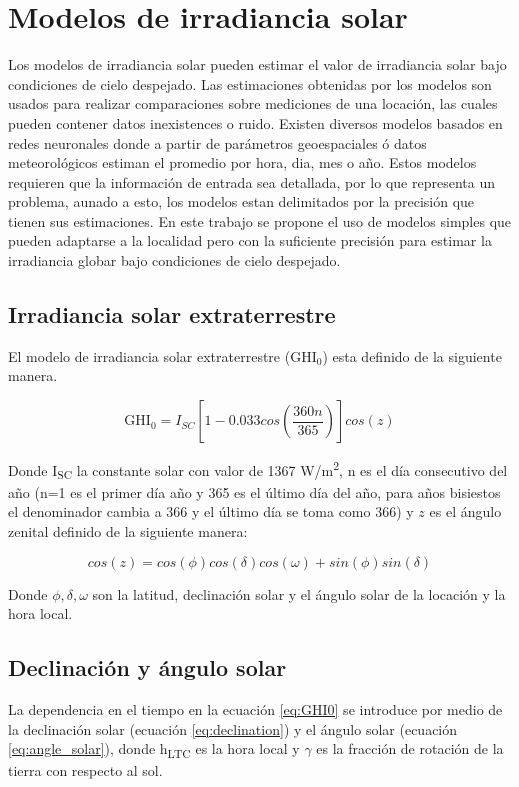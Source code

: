\section{Modelos de irradiancia solar}
Los modelos de irradiancia solar pueden estimar el valor de irradiancia solar bajo condiciones de cielo despejado\cite{Gueymard_2012,Perez_Burgos_2017,Ineichen_2016}. Las estimaciones obtenidas por los modelos son usados para realizar comparaciones sobre mediciones de una locación, las cuales pueden contener datos inexistences o ruido. Existen diversos modelos basados en redes neuronales donde a partir de parámetros geoespaciales ó datos meteorológicos estiman el promedio por hora, dia, mes o año\cite{Hasni_2012,Kumar_2019,Ozgoren_2012,Sahan_2016}. Estos modelos requieren que la información de entrada sea detallada, por lo que representa un problema, aunado a esto, los modelos estan delimitados por la precisión que tienen sus estimaciones\cite{Ruiz_Arias_2018}. En este trabajo se propone el uso de modelos simples que pueden adaptarse a la localidad pero con la suficiente precisión para estimar la irradiancia globar bajo condiciones de cielo despejado.

\subsection{Irradiancia solar extraterrestre}
El modelo de irradiancia solar extraterrestre (GHI$_0$) esta definido de la siguiente manera\cite{Muhammad_1983}.

\begin{equation}
	\text{GHI}_0 = I_{SC}\left[ 1-0.033 cos\left( \frac{360n}{365}  \right)\right] cos(z)  \label{eq:GHI0}
\end{equation}

Donde I\textsubscript{SC} la constante solar con valor de 1367 W/m\textsuperscript{2}, n es el día consecutivo del año (n=1 es el primer día año y 365 es el último día del año, para años bisiestos el denominador cambia a 366 y el último día se toma como 366) y $z$ es el ángulo zenital definido de la  siguiente manera:

\begin{equation}
	cos(z) = cos(\phi)cos(\delta)cos(\omega)+sin(\phi)sin(\delta)
\end{equation}

Donde $\phi,\delta,\omega$ son la latitud, declinación solar y el ángulo solar de la locación y la hora local.

\subsection{Declinación y ángulo solar}
La dependencia en el tiempo en la ecuación \ref{eq:GHI0} se introduce por medio de la declinación solar (ecuación \ref{eq:declination}) y el ángulo solar (ecuación \ref{eq:angle_solar}), donde h\textsubscript{LTC} es la hora local y $\gamma$ es la fracción de rotación de la tierra con respecto al sol.

